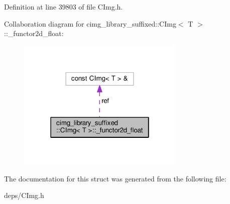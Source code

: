 Definition at line 39803 of file C\+Img.\+h.



Collaboration diagram for cimg\+\_\+library\+\_\+suffixed\+:\+:C\+Img$<$ T $>$\+:\+:\+\_\+functor2d\+\_\+float\+:
\nopagebreak
\begin{figure}[H]
\begin{center}
\leavevmode
\includegraphics[width=226pt]{df/d5b/structcimg__library__suffixed_1_1CImg_1_1__functor2d__float__coll__graph}
\end{center}
\end{figure}


The documentation for this struct was generated from the following file\+:\begin{DoxyCompactItemize}
\item 
deps/C\+Img.\+h\end{DoxyCompactItemize}
